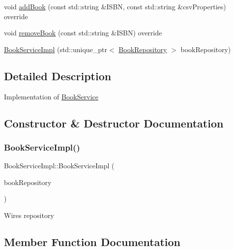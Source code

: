 \begin{DoxyCompactItemize}
\item 
void \hyperlink{classBookServiceImpl_a990c823f559356c2a6290b9acc9eeb91}{add\+Book} (const std\+::string \&I\+S\+BN, const std\+::string \&csv\+Properties) override
\item 
void \hyperlink{classBookServiceImpl_ad0673fa9012b0454b0cbed190bcdc6e4}{remove\+Book} (const std\+::string \&I\+S\+BN) override
\item 
\hyperlink{classBookServiceImpl_a1c9ad17c6f49272224fe37b2c53e864d}{Book\+Service\+Impl} (std\+::unique\+\_\+ptr$<$ \hyperlink{classBookRepository}{Book\+Repository} $>$ book\+Repository)
\end{DoxyCompactItemize}


\subsection{Detailed Description}
Implementation of \hyperlink{classBookService}{Book\+Service} 

\subsection{Constructor \& Destructor Documentation}
\mbox{\label{classBookServiceImpl_a1c9ad17c6f49272224fe37b2c53e864d}} 
\subsubsection{\texorpdfstring{Book\+Service\+Impl()}{BookServiceImpl()}}
{\footnotesize\ttfamily Book\+Service\+Impl\+::\+Book\+Service\+Impl (\begin{DoxyParamCaption}\item[{std\+::unique\+\_\+ptr$<$ \hyperlink{classBookRepository}{Book\+Repository} $>$}]{book\+Repository }\end{DoxyParamCaption})}

Wires repository 

\subsection{Member Function Documentation}
\mbox{\label{classBookServiceImpl_a990c823f559356c2a6290b9acc9eeb91}} 
